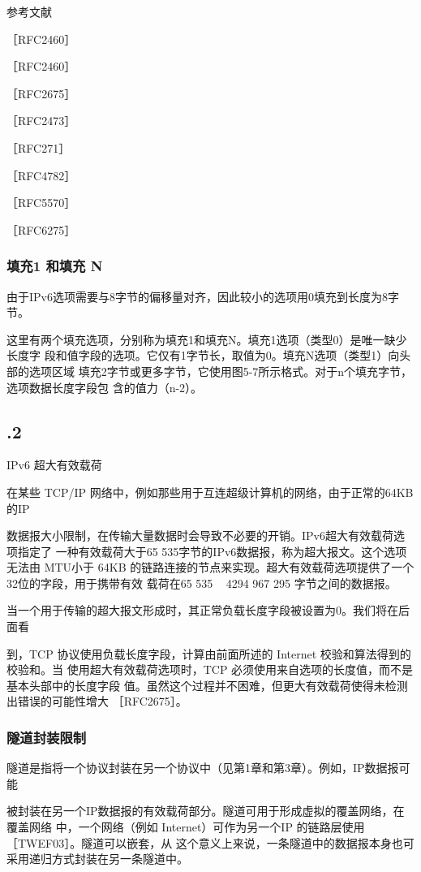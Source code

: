 参考文献

［RFC2460］

［RFC2460］

［RFC2675］

［RFC2473］

［RFC271］

［RFC4782］

［RFC5570］

［RFC6275］

\subsubsection{填充1 和填充 N}
由于IPv6选项需要与8字节的偏移量对齐，因此较小的选项用0填充到长度为8字节。

这里有两个填充选项，分别称为填充1和填充N。填充1选项（类型0）是唯一缺少长度字
段和值字段的选项。它仅有1字节长，取值为0。填充N选项（类型1）向头部的选项区域
填充2字节或更多字节，它使用图5-7所示格式。对于n个填充字节，选项数据长度字段包
含的值力（n-2）。

\subsection{.2}
IPv6 超大有效载荷

在某些 TCP/IP 网络中，例如那些用于互连超级计算机的网络，由于正常的64KB 的IP

数据报大小限制，在传输大量数据时会导致不必要的开销。IPv6超大有效载荷选项指定了
一种有效载荷大于65 535字节的IPv6数据报，称为超大报文。这个选项无法由 MTU小于
64KB 的链路连接的节点来实现。超大有效载荷选项提供了一个32位的字段，用于携带有效
载荷在65 535 ~ 4294 967 295 字节之间的数据报。

当一个用于传输的超大报文形成时，其正常负载长度字段被设置为0。我们将在后面看

到，TCP 协议使用负载长度字段，计算由前面所述的 Internet 校验和算法得到的校验和。当
使用超大有效载荷选项时，TCP 必须使用来自选项的长度值，而不是基本头部中的长度字段
值。虽然这个过程并不困难，但更大有效载荷使得未检测出错误的可能性增大 ［RFC2675］。

\subsubsection{隧道封装限制}
隧道是指将一个协议封装在另一个协议中（见第1章和第3章）。例如，IP数据报可能

被封装在另一个IP数据报的有效载荷部分。隧道可用于形成虚拟的覆盖网络，在覆盖网络
中，一个网络（例如 Internet）可作为另一个IP 的链路层使用［TWEF03］。隧道可以嵌套，从
这个意义上来说，一条隧道中的数据报本身也可采用递归方式封装在另一条隧道中。

